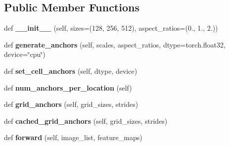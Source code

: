 \subsection*{Public Member Functions}
\begin{DoxyCompactItemize}
\item 
\mbox{\label{classtorchvision_1_1models_1_1detection_1_1rpn_1_1AnchorGenerator_a4edc8d7050587f1b47e7e9a0bb9d7129}} 
def {\bfseries \+\_\+\+\_\+init\+\_\+\+\_\+} (self, sizes=(128, 256, 512), aspect\+\_\+ratios=(0., 1., 2.))
\item 
\mbox{\label{classtorchvision_1_1models_1_1detection_1_1rpn_1_1AnchorGenerator_a0d018ec8e2576e282a915cdee14aa3db}} 
def {\bfseries generate\+\_\+anchors} (self, scales, aspect\+\_\+ratios, dtype=torch.\+float32, device=\char`\"{}cpu\char`\"{})
\item 
\mbox{\label{classtorchvision_1_1models_1_1detection_1_1rpn_1_1AnchorGenerator_aea54ce6f6d80e2615d6a98e2d27771a7}} 
def {\bfseries set\+\_\+cell\+\_\+anchors} (self, dtype, device)
\item 
\mbox{\label{classtorchvision_1_1models_1_1detection_1_1rpn_1_1AnchorGenerator_a9b1c33a3e35015cd653c31f4db62c697}} 
def {\bfseries num\+\_\+anchors\+\_\+per\+\_\+location} (self)
\item 
\mbox{\label{classtorchvision_1_1models_1_1detection_1_1rpn_1_1AnchorGenerator_a12b4dba4ceb199ad95af5eee939a0251}} 
def {\bfseries grid\+\_\+anchors} (self, grid\+\_\+sizes, strides)
\item 
\mbox{\label{classtorchvision_1_1models_1_1detection_1_1rpn_1_1AnchorGenerator_a8b50db7adcf16fd4b05c90358d6aeaa7}} 
def {\bfseries cached\+\_\+grid\+\_\+anchors} (self, grid\+\_\+sizes, strides)
\item 
\mbox{\label{classtorchvision_1_1models_1_1detection_1_1rpn_1_1AnchorGenerator_ab5b24936f575ccfa5175663def4e3e86}} 
def {\bfseries forward} (self, image\+\_\+list, feature\+\_\+maps)
\end{DoxyCompactItemize}
